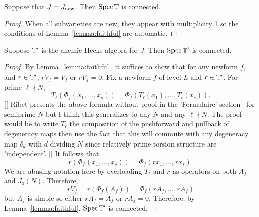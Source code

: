 \documentclass{article}
\begin{document}
\begin{proposition}
    Suppose that $J=J_{\operatorname{new}}$. Then $\operatorname{Spec}\mathbb{T}$ is connected.
\end{proposition}
\begin{proof}
    When all subvarieties are new, they appear with multiplicity 1 so the
    conditions of Lemma~\ref{lemma:faithful} are automatic.
\end{proof}

\begin{proposition}
    Suppose $\mathbb{T}'$ is the anemic Hecke algebra for $J$. Then $\operatorname{Spec}\mathbb{T}'$ is connected.
\end{proposition}
\begin{proof}
    By Lemma~\ref{lemma:faithful}, it suffices to show that for any newform
    $f$, and $r\in \mathbb{T}'$, $rV_f=V_f$ or $rV_f=0$. Fix a newform $f$ of level
    $L$ and $r\in \mathbb{T}'$. For prime $\ell\nmid N$,
    \[
        T_\ell(\Phi_f(x_1,\ldots,x_s))
        = \Phi_f(T_\ell(x_1),\ldots,T_\ell(x_s)).
    \]
    [[
    Ribet presents the above formula without proof in the 'Formulaire'
    section~\cite{MR1085264} for semiprime $N$ but I think this generalizes to
    any $N$ and any $\ell\nmid N$. The proof would be to write $T_\ell$ the
    composition of the pushforward and pullback of degeneracy maps then use the
    fact that this will commute with any degeneracy map $\delta_d$ with $d$
    dividing $N$ since relatively prime torsion structure are 'independent'.
    ]]
    It follows that
    \[
        r(\Phi_f(x_1,\ldots,x_s))
        = \Phi_f(rx_1,\ldots,rx_s).
    \]
    We are abusing notation here by overloading $T_\ell$ and $r$ as operators
    on both $A_f$ and $J_0(N)$. Therefore,
    \[
        rV_f = r(\Phi_f(A_f)) = \Phi_f(rA_f,\ldots,rA_f)
    \]
    but $A_f$ is simple so either $rA_f=A_f$ or $rA_f=0$. Therefore, by
    Lemma~\ref{lemma:faithful}, $\operatorname{Spec}\mathbb{T}'$ is connected.
\end{proof}


\end{document}
